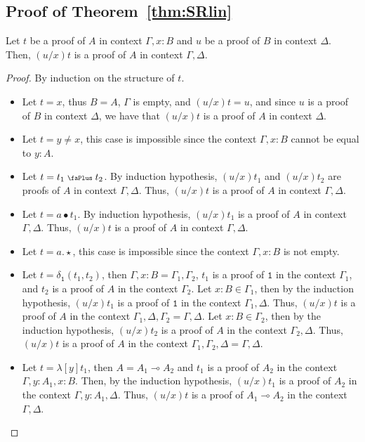 \documentclass[screen, sigconf,authorversion,nonacm]{acmart}
\theoremstyle{acmdefinition}
\numberwithin{equation}{section}
\newcommand\abstr[1]{[#1]}
\newcommand\plus{\mathrel{\text{\normalfont\scalebox{0.7}{\faPlus}}}}
\newcommand\one{\ensuremath{\mathtt 1}}
\newcommand\elimone{\delta_{\one}}
\begin{document}
\subsection{Proof of Theorem~\ref{thm:SRlin}}
\begin{proposition}
  [Substitution]\label{lem:substitutionLin}
  Let $t$ be a proof of $A$ in context $\Gamma,x:B$ and $u$ be a proof of $B$ in context $\Delta$. Then, $(u/x)t$ is a proof of $A$ in context $\Gamma,\Delta$.
\end{proposition}
\begin{proof}
  By induction on the structure of $t$.
  \begin{itemize}
      \item Let $t=x$, thus $B=A$, $\Gamma$ is empty, and $(u/x)t = u$, and since $u$ is a proof of $B$ in context $\Delta$, we have that $(u/x)t$ is a proof of $A$ in context $\Delta$.

      \item Let $t=y\neq x$, this case is impossible since the context $\Gamma,x:B$ cannot be equal to $y:A$.

     \item Let $t=t_1\plus t_2$. By induction hypothesis, $(u/x)t_1$ and $(u/x)t_2$ are proofs of $A$ in context $\Gamma,\Delta$. Thus, $(u/x)t$ is a proof of $A$ in context $\Gamma,\Delta$.
     
     \item Let $t=a\bullet t_1$. By induction hypothesis, $(u/x)t_1$ is a proof of $A$ in context $\Gamma,\Delta$. Thus, $(u/x)t$ is a proof of $A$ in context $\Gamma,\Delta$.
     
     \item Let $t=a.\star$, this case is impossible since the context $\Gamma,x:B$ is not empty.
     
     \item Let $t=\elimone(t_1,t_2)$, then $\Gamma,x:B=\Gamma_1,\Gamma_2$, $t_1$ is a proof of $\one$ in the context $\Gamma_1$, and $t_2$ is a proof of $A$ in the context $\Gamma_2$. Let $x:B\in\Gamma_1$, then by the induction hypothesis, $(u/x)t_1$ is a proof of $\one$ in the context $\Gamma_1,\Delta$. Thus, $(u/x)t$ is a proof of $A$ in the context $\Gamma_1,\Delta,\Gamma_2=\Gamma,\Delta$.
     Let $x:B\in\Gamma_2$, then by the induction hypothesis, $(u/x)t_2$ is a proof of $A$ in the context $\Gamma_2,\Delta$. Thus, $(u/x)t$ is a proof of $A$ in the context $\Gamma_1,\Gamma_2,\Delta=\Gamma,\Delta$.

     \item Let $t=\lambda\abstr{y}t_1$, then $A=A_1\multimap A_2$ and $t_1$ is a proof of $A_2$ in the context $\Gamma,y:A_1,x:B$. Then, by the induction hypothesis, $(u/x)t_1$ is a proof of $A_2$ in the context $\Gamma,y:A_1,\Delta$. Thus, $(u/x)t$ is a proof of $A_1\multimap A_2$ in the context $\Gamma,\Delta$. 


\end{itemize}
\end{proof}
\end{document}
